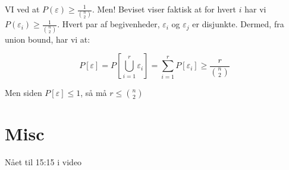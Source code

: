 \documentclass[11pt]{article}
\theoremstyle{definition}
\theoremstyle{remark}
\begin{document}
VI ved at $P(\varepsilon) \geq \frac{1}{\binom{n}{2}}$. Men! Beviset viser faktisk at for hvert $i$ har vi $P(\varepsilon_{i}) \geq \frac{1}{\binom{n}{2}}$. Hvert par af begivenheder, $\varepsilon_{i}$ og $\varepsilon_{j}$ er disjunkte. Dermed, fra union bound, har vi at:

\[
P[\varepsilon] = P[\bigcup\limits_{i=1}^{r} \varepsilon_{i}] = \sum_{i=1}^{r} P[\varepsilon_{i}] \geq \frac{r}{\binom{n}{2}}
\]

Men siden $P[\varepsilon] \leq 1$, så må $r \leq \binom{n}{2}$









\section{Misc}
\label{sec:misc}


Nået til 15:15 i video
\end{document}
